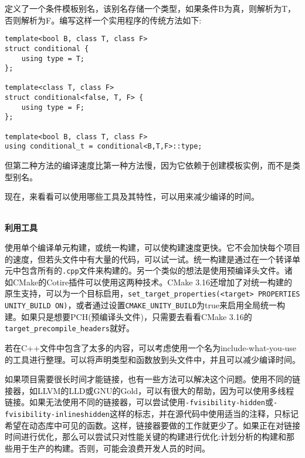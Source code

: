 定义了一个条件模板别名，该别名存储一个类型，如果条件B为真，则解析为T，否则解析为F。编写这样一个实用程序的传统方法如下:

\begin{lstlisting}[style=styleCXX]
template<bool B, class T, class F>
struct conditional {
	using type = T;
};

template<class T, class F>
struct conditional<false, T, F> {
	using type = F;
};

template<bool B, class T, class F>
using conditional_t = conditional<B,T,F>::type;
\end{lstlisting}

但第二种方法的编译速度比第一种方法慢，因为它依赖于创建模板实例，而不是类型别名。

现在，来看看可以使用哪些工具及其特性，可以用来减少编译的时间。

\hspace*{\fill} \\ %
\noindent
\textbf{利用工具}

使用单个编译单元构建，或统一构建，可以使构建速度更快。它不会加快每个项目的速度，但若头文件中有大量的代码，可以试一试。统一构建是通过在一个转译单元中包含所有的\texttt{.cpp}文件来构建的。另一个类似的想法是使用预编译头文件。诸如CMake的Cotire插件可以使用这两种技术。CMake 3.16还增加了对统一构建的原生支持，可以为一个目标启用，\texttt{set\_target\_properties(<target> PROPERTIES UNITY\_BUILD ON)}，或者通过设置\texttt{CMAKE\_UNITY\_BUILD}为true来启用全局统一构建。如果只是想要PCH(预编译头文件)，只需要去看看CMake 3.16的\texttt{target\_precompile\_headers}就好。

\begin{tcolorbox}[colback=webgreen!5!white,colframe=webgreen!75!black, title=TIP]
\hspace*{0.7cm}若在C++文件中包含了太多的内容，可以考虑使用一个名为include-what-you-use的工具进行整理。可以将声明类型和函数放到头文件中，并且可以减少编译时间。
\end{tcolorbox}

如果项目需要很长时间才能链接，也有一些方法可以解决这个问题。使用不同的链接器，如LLVM的LLD或GNU的Gold，可以有很大的帮助，因为可以使用多线程链接。如果无法使用不同的链接器，可以尝试使用\texttt{-fvisibility-hidden}或\texttt{-fvisibility-inlineshidden}这样的标志，并在源代码中使用适当的注释，只标记希望在动态库中可见的函数。这样，链接器要做的工作就更少了。如果正在对链接时间进行优化，那么可以尝试只对性能关键的构建进行优化:计划分析的构建和那些用于生产的构建。否则，可能会浪费开发人员的时间。

